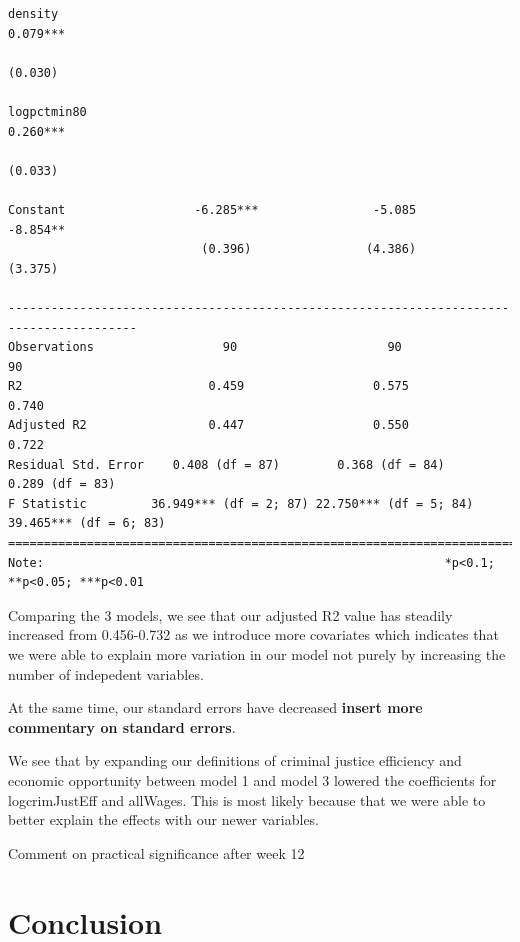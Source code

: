 \documentclass[]{article}
\begin{document}
\begin{verbatim}
density                                                                  0.079***       
                                                                         (0.030)        
                                                                                        
logpctmin80                                                              0.260***       
                                                                         (0.033)        
                                                                                        
Constant                  -6.285***                -5.085                -8.854**       
                           (0.396)                (4.386)                (3.375)        
                                                                                        
----------------------------------------------------------------------------------------
Observations                  90                     90                     90          
R2                          0.459                  0.575                  0.740         
Adjusted R2                 0.447                  0.550                  0.722         
Residual Std. Error    0.408 (df = 87)        0.368 (df = 84)        0.289 (df = 83)    
F Statistic         36.949*** (df = 2; 87) 22.750*** (df = 5; 84) 39.465*** (df = 6; 83)
========================================================================================
Note:                                                        *p<0.1; **p<0.05; ***p<0.01
\end{verbatim}

Comparing the 3 models, we see that our adjusted R2 value has steadily
increased from 0.456-0.732 as we introduce more covariates which
indicates that we were able to explain more variation in our model not
purely by increasing the number of indepedent variables.

At the same time, our standard errors have decreased \textbf{insert more
commentary on standard errors}.

We see that by expanding our definitions of criminal justice efficiency
and economic opportunity between model 1 and model 3 lowered the
coefficients for logcrimJustEff and allWages. This is most likely
because that we were able to better explain the effects with our newer
variables.

Comment on practical significance after week 12

\hypertarget{conclusion}{%
\section{Conclusion}\label{conclusion}}
\end{document}
